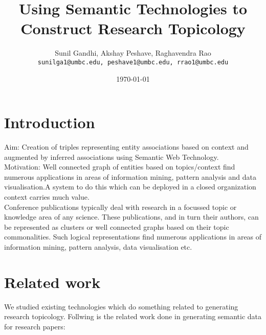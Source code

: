 \documentclass[a4paper,12pt]{article}
\begin{document}


\title{Using Semantic Technologies to Construct Research Topicology}
\author{Sunil Gandhi, Akshay Peshave, Raghavendra Rao\\ 
\texttt{sunilga1@umbc.edu, peshave1@umbc.edu, rrao1@umbc.edu}}
\date{\today}
\maketitle



\begin{abstract} 
\end{abstract} 

\section{Introduction}
Aim: Creation of triples representing entity associations based on context and augmented by inferred associations using Semantic Web Technology.\\

Motivation: 
Well connected graph of entities based on topics/context find numerous applications in areas of information mining, pattern analysis and data visualisation.A system to do this which can be deployed in a closed organization context carries much value.\\

Conference publications typically deal with research in a focussed topic or knowledge area of any science. These publications, and in turn their authors, can be represented as clusters or well connected graphs based on their topic commonalities. Such logical representations find numerous applications in areas of information mining, pattern analysis, data visualisation etc. 

\section{Related work}
We studied existing technologies which do something related to generating research topicology. Follwing is the related work done in generating semantic data for research papers:
\end{document}
